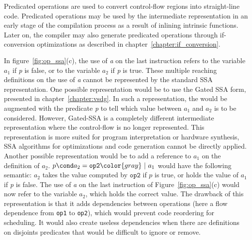 
Predicated operations are used to convert control-flow regions into
straight-line code. Predicated operations may be used by the intermediate
representation in an early stage of the compilation process as a result of inlining intrinsic functions. Later on, the compiler may
also generate predicated operations through if-conversion optimizations
as described in chapter~\ref{chapter:if_conversion}.


In figure~\ref{fig:op_ssa}(c), the use of \textit{a} on the last
instruction refers to the variable ${a_1}$ if \textit{p} is false, or
to the variable ${a_2}$ if \textit{p} is true. These multiple
reaching definitions on the use of \textit{a} cannot be represented by
the standard SSA representation.
%
One possible representation would be to use the Gated SSA form,
presented in chapter~\ref{chapter:vsdg}. In such a representation, the
\phifun would be augmented with the predicate \textit{p} to tell
which value between ${a_1}$ and ${a_2}$ is to be
considered. However, Gated-SSA is a completely different intermediate
representation where the control-flow is no longer represented. This
representation is more suited for program interpretation or hardware
synthesis, SSA algorithms for optimizations and code generation cannot
be directly applied.
%
Another possible representation would be to add a reference to ${a_1}$
 on the definition of ${a_2}$. $p\cond a_2=\texttt{op2} {\color{gray}~|~a_1}$ 
would have the following semantic: ${a_2}$ takes the value computed by $\texttt{op2}$ if $p$ is true, or holds
the value of ${a_1}$ if \textit{p} is {false}. The use of \textit{a} on the last instruction of Figure~\ref{fig:op_ssa}(c)
would now refer to the variable ${a_2}$, which holds the correct
value. The drawback of this representation is that it adds
dependencies between operations (here a flow dependence from \texttt{op1} to \texttt{op2}), which would prevent code reordering
for scheduling. It would also create useless dependencies when there
are definitions on disjoints predicates that would be difficult to
ignore or remove.

